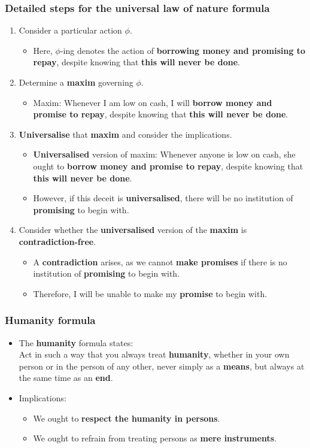 \documentclass[11pt]{article}
\begin{document}
\subsubsection{Detailed steps for the universal law of nature formula}
\label{sec:orgdf413f9}
\begin{enumerate}
\item Consider a particular action \(\phi\).
\begin{itemize}
\item Here, \(\phi\)-ing denotes the action of \textbf{borrowing money and promising to repay}, despite knowing that \textbf{this will never be done}.
\end{itemize}
\item Determine a \textbf{maxim} governing \(\phi\).
\begin{itemize}
\item Maxim: Whenever I am low on cash, I will \textbf{borrow money and promise to repay}, despite knowing that \textbf{this will never be done}.
\end{itemize}
\item \textbf{Universalise} that \textbf{maxim} and consider the implications.
\begin{itemize}
\item \textbf{Universalised} version of maxim: Whenever anyone is low on cash, she ought to \textbf{borrow money and promise to repay}, despite knowing that \textbf{this will never be done}.
\item However, if this deceit is \textbf{universalised}, there will be no institution of \textbf{promising} to begin with.
\end{itemize}
\item Consider whether the \textbf{universalised} version of the \textbf{maxim} is \textbf{contradiction-free}.
\begin{itemize}
\item A \textbf{contradiction} arises, as we cannot \textbf{make promises} if there is no institution of \textbf{promising} to begin with.
\item Therefore, I will be unable to make my \textbf{promise} to begin with.
\end{itemize}
\end{enumerate}
\subsubsection{Humanity formula}
\label{sec:orgb8539dc}
\begin{itemize}
\item The \textbf{humanity} formula states:  \\
Act in such a way that you always treat \textbf{humanity}, whether in your own person or in the person of any other, never simply as a \textbf{means}, but always at the same time as an \textbf{end}.
\item Implications:
\begin{itemize}
\item We ought to \textbf{respect the humanity in persons}.
\item We ought to refrain from treating persons as \textbf{mere instruments}.
\end{itemize}
\end{itemize}
\end{document}
